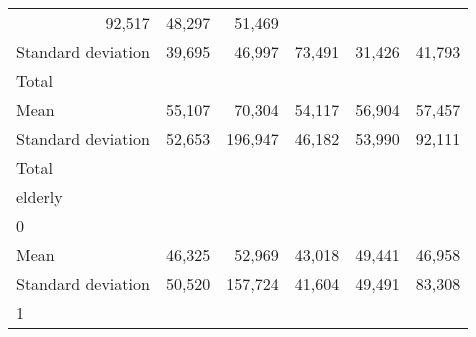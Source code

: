 \begin{tabular}{llllll}
  \multicolumn{1}{r}{92,517} &
  \multicolumn{1}{r}{48,297} &
  \multicolumn{1}{r}{51,469} \\
\multicolumn{1}{l}{\hspace{4em}Standard deviation} &
  \multicolumn{1}{|r}{39,695} &
  \multicolumn{1}{r}{46,997} &
  \multicolumn{1}{r}{73,491} &
  \multicolumn{1}{r}{31,426} &
  \multicolumn{1}{r}{41,793} \\
\multicolumn{1}{l}{\hspace{3em}Total} &
  \multicolumn{1}{|r}{} &
  \multicolumn{1}{r}{} &
  \multicolumn{1}{r}{} &
  \multicolumn{1}{r}{} &
  \multicolumn{1}{r}{} \\
\multicolumn{1}{l}{\hspace{4em}Mean} &
  \multicolumn{1}{|r}{55,107} &
  \multicolumn{1}{r}{70,304} &
  \multicolumn{1}{r}{54,117} &
  \multicolumn{1}{r}{56,904} &
  \multicolumn{1}{r}{57,457} \\
\multicolumn{1}{l}{\hspace{4em}Standard deviation} &
  \multicolumn{1}{|r}{52,653} &
  \multicolumn{1}{r}{196,947} &
  \multicolumn{1}{r}{46,182} &
  \multicolumn{1}{r}{53,990} &
  \multicolumn{1}{r}{92,111} \\
\multicolumn{1}{l}{\hspace{1em}Total} &
  \multicolumn{1}{|r}{} &
  \multicolumn{1}{r}{} &
  \multicolumn{1}{r}{} &
  \multicolumn{1}{r}{} &
  \multicolumn{1}{r}{} \\
\multicolumn{1}{l}{\hspace{2em}elderly} &
  \multicolumn{1}{|r}{} &
  \multicolumn{1}{r}{} &
  \multicolumn{1}{r}{} &
  \multicolumn{1}{r}{} &
  \multicolumn{1}{r}{} \\
\multicolumn{1}{l}{\hspace{3em}0} &
  \multicolumn{1}{|r}{} &
  \multicolumn{1}{r}{} &
  \multicolumn{1}{r}{} &
  \multicolumn{1}{r}{} &
  \multicolumn{1}{r}{} \\
\multicolumn{1}{l}{\hspace{4em}Mean} &
  \multicolumn{1}{|r}{46,325} &
  \multicolumn{1}{r}{52,969} &
  \multicolumn{1}{r}{43,018} &
  \multicolumn{1}{r}{49,441} &
  \multicolumn{1}{r}{46,958} \\
\multicolumn{1}{l}{\hspace{4em}Standard deviation} &
  \multicolumn{1}{|r}{50,520} &
  \multicolumn{1}{r}{157,724} &
  \multicolumn{1}{r}{41,604} &
  \multicolumn{1}{r}{49,491} &
  \multicolumn{1}{r}{83,308} \\
\multicolumn{1}{l}{\hspace{3em}1} &

\end{tabular}
